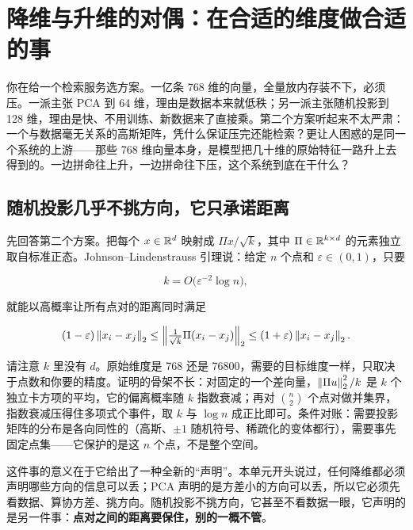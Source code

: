 \section{降维与升维的对偶：在合适的维度做合适的事}
\label{sec:13-Machine-Learning/04-Dimensionality-Reduction/05}

你在给一个检索服务选方案。一亿条 768 维的向量，全量放内存装不下，必须压。一派主张 PCA 到 64 维，理由是数据本来就低秩；另一派主张随机投影到 128 维，理由是快、不用训练、新数据来了直接乘。第二个方案听起来不太严肃：一个与数据毫无关系的高斯矩阵，凭什么保证压完还能检索？更让人困惑的是同一个系统的上游——那些 768 维向量本身，是模型把几十维的原始特征一路升上去得到的。一边拼命往上升，一边拼命往下压，这个系统到底在干什么？

\subsection{随机投影几乎不挑方向，它只承诺距离}

先回答第二个方案。把每个 \(x\in\mathbb{R}^d\) 映射成 \(\Pi x/\sqrt k\)，其中 \(\Pi\in\mathbb{R}^{k\times d}\) 的元素独立取自标准正态。Johnson--Lindenstrauss 引理说：给定 \(n\) 个点和 \(\varepsilon\in(0,1)\)，只要

\[
k = O\bigl(\varepsilon^{-2}\log n\bigr),
\]

就能以高概率让所有点对的距离同时满足

\[
(1-\varepsilon)\left\lVert x_i-x_j\right\rVert_2 \le \left\lVert\tfrac{1}{\sqrt k}\Pi(x_i-x_j)\right\rVert_2 \le (1+\varepsilon)\left\lVert x_i-x_j\right\rVert_2 .
\]

请注意 \(k\) 里没有 \(d\)。原始维度是 768 还是 76800，需要的目标维度一样，只取决于点数和你要的精度。证明的骨架不长：对固定的一个差向量，\(\left\lVert\Pi u\right\rVert_2^2/k\) 是 \(k\) 个独立卡方项的平均，它的偏离概率随 \(k\) 指数衰减；再对 \(\binom{n}{2}\) 个点对做并集界，指数衰减压得住多项式个事件，取 \(k\) 与 \(\log n\) 成正比即可。条件对账：需要投影矩阵的分布是各向同性的（高斯、\(\pm1\) 随机符号、稀疏化的变体都行），需要事先固定点集——它保护的是这 \(n\) 个点，不是整个空间。

这件事的意义在于它给出了一种全新的``声明''。本单元开头说过，任何降维都必须声明哪些方向的信息可以丢；PCA 声明的是方差小的方向可以丢，所以它必须先看数据、算协方差、挑方向。随机投影不挑方向，它甚至不看数据一眼，它声明的是另一件事：\textbf{点对之间的距离要保住，别的一概不管}。

